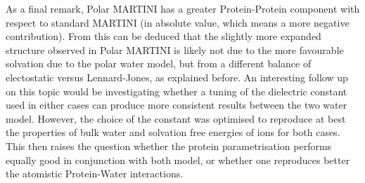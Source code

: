 As a final remark, Polar MARTINI has a greater Protein-Protein component with respect to standard MARTINI (in absolute value, which means a more negative contribution). From this can be deduced that the slightly more expanded structure observed in Polar MARTINI is likely not due to the more favourable solvation due to the polar water model, but from a different balance of electostatic versus Lennard-Jones, as explained before.
%
An interesting follow up on this topic would be investigating whether a tuning of the dielectric constant used in either cases can produce more consistent results between the two water model. However, the choice of the constant was optimised to reproduce at best the properties of bulk water and solvation free energies of ions for both cases. This then raises the question whether the protein parametrisation performs equally good in conjunction with both model, or whether one reproduces better the atomistic Protein-Water interactions.


